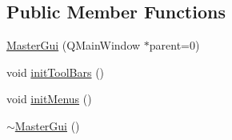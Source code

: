 \subsection*{Public Member Functions}
\begin{DoxyCompactItemize}
\item 
\hyperlink{class_master_gui_a9d3221a5d6791ffab353e038452e8b79}{Master\-Gui} (Q\-Main\-Window $\ast$parent=0)
\item 
void \hyperlink{class_master_gui_aa8cb5efc03f304d4a80d0d743a30e5b3}{init\-Tool\-Bars} ()
\item 
void \hyperlink{class_master_gui_a65f7212a54b92bdd21498478b9689631}{init\-Menus} ()
\item 
\hyperlink{class_master_gui_a4eeae08177c54aba4aad160fc1c5efc6}{$\sim$\-Master\-Gui} ()
\end{DoxyCompactItemize}
